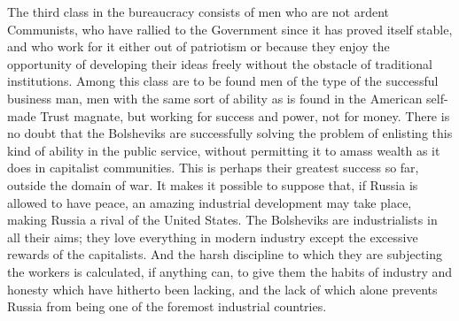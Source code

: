 The third class in the bureaucracy consists of men who are not ardent Communists, who have rallied to the Government since it has proved itself stable, and who work for it either out of patriotism or because they enjoy the opportunity of developing their ideas freely without the obstacle of traditional institutions. Among this class are to be found men of the type of the successful business man, men with the same sort of ability as is found in the American self-made Trust magnate, but working for success and power, not for money. There is no doubt that the Bolsheviks are successfully solving the problem of enlisting this kind of ability in the public service, without permitting it to amass wealth as it does in capitalist communities. This is perhaps their greatest success so far, outside the domain of war. It makes it possible to suppose that, if Russia is allowed to have peace, an amazing industrial development may take place, making Russia a rival of the United States. The Bolsheviks are industrialists in all their aims; they love everything in modern industry except the excessive rewards of the capitalists. And the harsh discipline to which they are subjecting the workers is calculated, if anything can, to give them the habits of industry and honesty which have hitherto been lacking, and the lack of which alone prevents Russia from being one of the foremost industrial countries.
